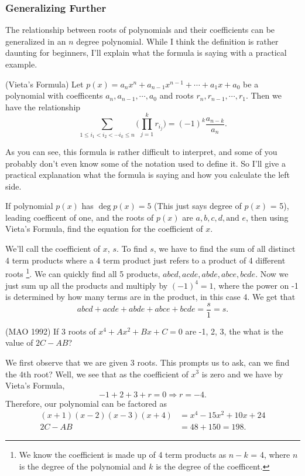 \documentclass[11pt]{article}
\begin{document}
 \subsubsection*{Generalizing Further}
 The relationship between roots of polynomials and their coefficients can be generalized in an $n$ degree polynomial. While I think the definition is rather daunting for beginners, I'll explain what the formula is saying with a practical example.
 \begin{definition}{(Vieta's Formula)}
    Let $p(x) = a_nx^n + a_{n-1}x^{n-1} + \cdots + a_1x + a_0$ be a polynomial with coefficents $a_n, a_{n-1}, \cdots, a_0$ and roots $r_n, r_{n-1}, \cdots, r_1$. Then we have the relationship
    \[
    \sum_{1 \leq i_1 < i_2 < \cdots i_k \leq n} \bigg( \prod_{j=1}^k r_{i_j}\bigg) = (-1)^k \frac{a_{n-k}}{a_n}.
    \]
 \end{definition}
 As you can see, this formula is rather difficult to interpret, and some of you probably don't even know some of the notation used to define it. So I'll give a practical explanation what the formula is saying and how you calculate the left side. 
 \begin{example}
    If polynomial $p(x)$ has $\deg p(x) = 5$ (This just says degree of $p(x)$ = 5), leading coefficent of one, and the roots of $p(x)$ are $a, b, c, d, \text{and } e$, then using Vieta's Formula, find the equation for the coefficient of $x$.
 \end{example}
 We'll call the coefficient of $x$, $s$. To find $s$, we have to find the sum of all distinct 4 term products where a 4 term product just refers to a product of 4 different roots \footnote{
    We know the coefficient is made up of 4 term products as $n-k$ = 4, where $n$ is the degree of the polynomial and $k$ is the degree of the coefficent.
 }. We can quickly find all 5 products, $abcd, acde, abde, abce, bcde$. Now we just sum up all the products and multiply by $(-1)^4=1$, where the power on -1 is determined by how many terms are in the product, in this case 4. We get that 
 \[
    abcd+acde+abde+abce+bcde=\frac{s}{1} = s.
 \]

 \begin{example}{(MAO 1992)}
    If 3 roots of $x^4+Ax^2+Bx+C=0$ are -1, 2, 3, the what is the value of $2C-AB$?
 \end{example}
We first observe that we are given 3 roots. This prompts us to ask, can we find the 4th root? Well, we see that as the coefficient of $x^3$ is zero and we have by Vieta's Formula,
\[
-1 + 2 + 3 + r = 0 \Longrightarrow r = -4.
\]
Therefore, our polynomial can be factored as
\begin{equation*}
    \begin{aligned}
    (x+1)(x-2)(x-3)(x+4) & = x^4 - 15x^2 + 10x + 24 \\
    2C-AB & = 48 +150 = 198.    
    \end{aligned}
\end{equation*}
\end{document}
